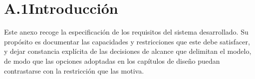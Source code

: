 %
%
%

\newcommand{\requisito}[9]{%
  \vspace{6pt}
  \noindent\small\textbf{#1 \textemdash\ #2}
  \vspace{2pt}

  \noindent\small
  \begin{tabularx}{\textwidth}{|p{3.2cm}|X|}
  \hline
  \textbf{Identificador} & #1 \\ \hline
  \textbf{Nombre}        & #2 \\ \hline
  \textbf{Tipo}          & #3 \\ \hline
  \textbf{Prioridad}     & #4 \\ \hline
  \textbf{Fuente}        & #5 \\ \hline
  \textbf{Descripción}   & #6 \\ \hline
  \textbf{Justificación} & #7 \\ \hline
  \textbf{Dependencias}  & #8 \\ \hline
  \textbf{Verificación}  & #9 \\ \hline
  \end{tabularx}
  \vspace{8pt}
}


\section*{A.1\quad Introducción}

Este anexo recoge la especificación de los requisitos del sistema desarrollado.
Su propósito es documentar las capacidades y restricciones que este debe
satisfacer, y dejar constancia explícita de las decisiones de alcance que
delimitan el modelo, de modo que las opciones adoptadas en los capítulos de
diseño puedan contrastarse con la restricción que las motiva.

